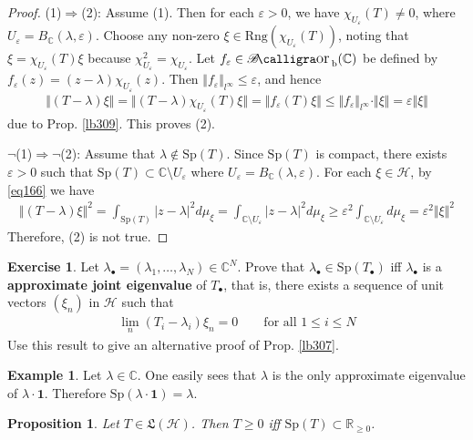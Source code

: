 \documentclass[12pt,b5paper,notitlepage]{article}
\theoremstyle{definition}
\newtheorem{eg}[df]{Example}
\newtheorem{exe}[df]{Exercise}
\theoremstyle{plain}
\newtheorem{pp}[df]{Proposition}
\DeclareMathOperator{\Borb}{{\mathscr{B}\text{\kern -2pt {\calligra\large or}}\,}_{\mathrm b}}
\newcommand{\fk}{\mathfrak}
\newcommand{\idt}{\mathbf{1}}
\newcommand{\blt}{\bullet}
\newcommand{\Cbb}{\mathbb C}
\newcommand{\Rbb}{\mathbb R}
\newcommand{\Sp}{\mathrm{Sp}}
\newcommand{\Rng}{\mathrm{Rng}}
\newcommand{\eps}{\varepsilon}
\newcommand{\MH}{\mathcal H}
\numberwithin{equation}{section}
\begin{document}
\begin{proof}
(1)$\Rightarrow$(2): Assume (1). Then for each $\eps>0$, we have $\chi_{U_\eps}(T)\neq0$, where $U_\eps=B_\Cbb(\lambda,\eps)$. Choose any non-zero $\xi\in\Rng(\chi_{U_\eps}(T))$, noting that $\xi=\chi_{U_\eps}(T)\xi$ because $\chi_{U_\eps}^2=\chi_{U_\eps}$. Let $f_\eps\in\Borb(\Cbb)$ be defined by $f_\eps(z)=(z-\lambda)\chi_{U_\eps}(z)$. Then $\Vert f_\eps\Vert_{l^\infty}\leq\eps$, and hence
\begin{align*}
\Vert (T-\lambda)\xi\Vert=\Vert (T-\lambda)\chi_{U_\eps}(T)\xi\Vert=\Vert f_\eps(T)\xi\Vert\leq \Vert f_\eps\Vert_{l^\infty}\cdot\Vert\xi\Vert=\eps\Vert\xi\Vert
\end{align*}
due to Prop. \ref{lb309}. This proves (2).

$\neg$(1)$\Rightarrow$$\neg$(2): Assume that $\lambda\notin\Sp(T)$. Since $\Sp(T)$ is compact, there exists $\eps>0$ such that $\Sp(T)\subset\Cbb\setminus U_\eps$ where $U_\eps=B_\Cbb(\lambda,\eps)$. For each $\xi\in\MH$, by \eqref{eq166} we have
\begin{align*}
\Vert(T-\lambda)\xi\Vert^2=\int_{\Sp(T)}|z-\lambda|^2d\mu_\xi=\int_{\Cbb\setminus U_\eps}|z-\lambda|^2d\mu_\xi\geq\eps^2\int_{\Cbb\setminus U_\eps}d\mu_\xi=\eps^2\Vert\xi\Vert^2
\end{align*}
Therefore, (2) is not true.
\end{proof}


\begin{exe}
Let $\lambda_\blt=(\lambda_1,\dots,\lambda_N)\in\Cbb^N$. Prove that $\lambda_\blt\in\Sp(T_\blt)$ iff $\lambda_\blt$ is a \textbf{approximate joint eigenvalue}  of $T_\blt$, that is, there exists a sequence of unit vectors $(\xi_n)$ in $\MH$ such that
\begin{align*}
\lim_n (T_i-\lambda_i)\xi_n=0\qquad\text{for all }1\leq i\leq N
\end{align*}
Use this result to give an alternative proof of Prop. \ref{lb307}.
\end{exe}


\begin{eg}
Let $\lambda\in\Cbb$. One easily sees that $\lambda$ is the only approximate eigenvalue of $\lambda\cdot \idt$. Therefore $\Sp(\lambda\cdot\idt)=\lambda$.
\end{eg}

\begin{pp}\label{lb313}
Let $T\in\fk L(\MH)$. Then $T\geq0$ iff $\Sp(T)\subset\Rbb_{\geq0}$.
\end{pp}
\end{document}
